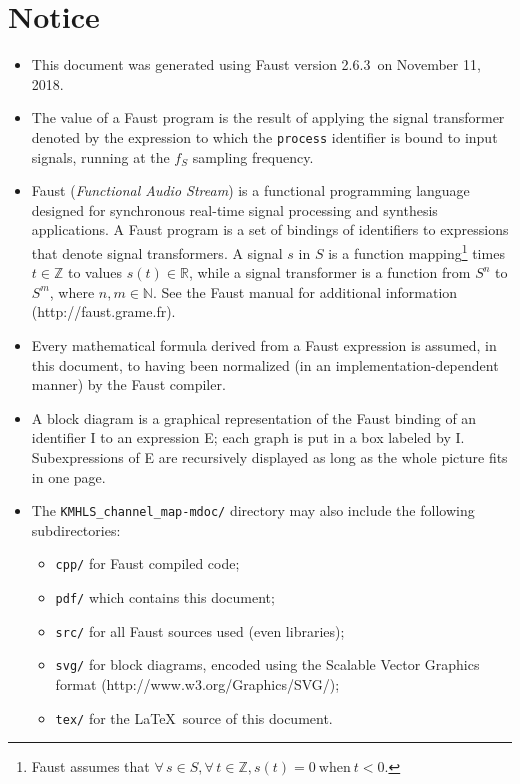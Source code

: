 \documentclass{article}
\newcommand{\faustdocdir}{KMHLS\_channel\_map-mdoc}
\newcommand{\faustversion}{2.6.3}
\newcommand{\faustdocdate}{November 11, 2018}
\begin{document}
 \section{Notice} \label{notice}  
\begin{itemize}
	\item This document was generated using Faust version \faustversion\ on \faustdocdate.
	\item The value of a Faust program is the result of applying the signal transformer denoted by the expression to which the \texttt{process} identifier is bound to input signals, running at the $f_S$ sampling frequency.
	\item Faust (\emph{Functional Audio Stream}) is a functional programming language designed for synchronous real-time signal processing and synthesis applications. A Faust program is a set of bindings of identifiers to expressions that denote signal transformers. A signal $s$ in $S$ is a function mapping\footnote{Faust assumes that $\forall \, s \in S, \forall \, t \in \mathbb{Z}, s(t) = 0 \mathrm{\ when\ } t < 0$.} times $t \in \mathbb{Z}$ to values $s(t) \in \mathbb{R}$, while a signal transformer is a function from $S^n$ to $S^m$, where $n,m\in \mathbb{N}$. See the Faust manual for additional information (\textsf{http://faust.grame.fr}).
	\item Every mathematical formula derived from a Faust expression is assumed, in this document, to having been normalized (in an implementation-depen\-dent manner) by the Faust compiler.
	\item A block diagram is a graphical representation of the Faust binding of an identifier I to an expression E; each graph is put in a box labeled by I. Subexpressions of E are recursively displayed as long as the whole picture fits in one page.
	\item The \texttt{\faustdocdir/} directory may also include the following subdirectories:
\begin{itemize}
	\item	\texttt{cpp/} for Faust compiled code; 
	\item	\texttt{pdf/} which contains this document; 
	\item	\texttt{src/} for all Faust sources used (even libraries); 
	\item	\texttt{svg/} for block diagrams, encoded using the Scalable Vector Graphics format (\textsf{http://www.w3.org/Graphics/SVG/});
	\item	\texttt{tex/} for the \LaTeX\ source of this document.
\end{itemize}
\end{itemize}
\end{document}
